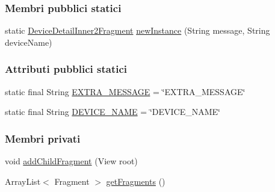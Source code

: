 \subsubsection*{Membri pubblici statici}
\begin{DoxyCompactItemize}
\item 
static \hyperlink{classit_1_1unibo_1_1torsello_1_1bluetoothpositioning_1_1fragment_1_1DeviceDetailInner2Fragment}{Device\+Detail\+Inner2\+Fragment} \hyperlink{classit_1_1unibo_1_1torsello_1_1bluetoothpositioning_1_1fragment_1_1DeviceDetailInner2Fragment_a27471a2d140a8dd11636ef23ffc20657_a27471a2d140a8dd11636ef23ffc20657}{new\+Instance} (String message, String device\+Name)
\end{DoxyCompactItemize}
\subsubsection*{Attributi pubblici statici}
\begin{DoxyCompactItemize}
\item 
static final String \hyperlink{classit_1_1unibo_1_1torsello_1_1bluetoothpositioning_1_1fragment_1_1DeviceDetailInner2Fragment_a5093b051b0d458a870b6eef51b088e7d_a5093b051b0d458a870b6eef51b088e7d}{E\+X\+T\+R\+A\+\_\+\+M\+E\+S\+S\+A\+GE} = \char`\"{}E\+X\+T\+R\+A\+\_\+\+M\+E\+S\+S\+A\+GE\char`\"{}
\item 
static final String \hyperlink{classit_1_1unibo_1_1torsello_1_1bluetoothpositioning_1_1fragment_1_1DeviceDetailInner2Fragment_aa28d537983d4cf578120a9c51eb2b0bb_aa28d537983d4cf578120a9c51eb2b0bb}{D\+E\+V\+I\+C\+E\+\_\+\+N\+A\+ME} = \char`\"{}D\+E\+V\+I\+C\+E\+\_\+\+N\+A\+ME\char`\"{}
\end{DoxyCompactItemize}
\subsubsection*{Membri privati}
\begin{DoxyCompactItemize}
\item 
void \hyperlink{classit_1_1unibo_1_1torsello_1_1bluetoothpositioning_1_1fragment_1_1DeviceDetailInner2Fragment_af61900b6821dff2086e86d646c990870_af61900b6821dff2086e86d646c990870}{add\+Child\+Fragment} (View root)
\item 
Array\+List$<$ Fragment $>$ \hyperlink{classit_1_1unibo_1_1torsello_1_1bluetoothpositioning_1_1fragment_1_1DeviceDetailInner2Fragment_a74ebcb936381919cfe4f3542585203c4_a74ebcb936381919cfe4f3542585203c4}{get\+Fragments} ()
\end{DoxyCompactItemize}

